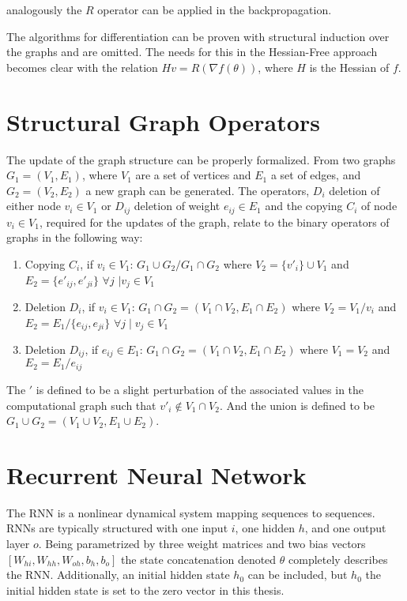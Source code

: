 \noindent
analogously the $R$ operator can be applied in the backpropagation.

The algorithms for differentiation can be proven with structural induction over the graphs and are omitted. The needs for this in the Hessian-Free approach becomes clear with the relation $Hv = R(\nabla f(\theta))$, where $H$ is the Hessian of $f$. 

\section{Structural Graph Operators}

The update of the graph structure can be properly formalized. From two graphs $G_1 = (V_1,E_1)$, where $V_1$ are a set of vertices and $E_1$ a set of edges, and $G_2 = (V_2, E_2)$ a new graph can be generated. The operators, $D_i$ deletion of either node $v_i \in V_1$ or $D_{ij}$ deletion of weight $e_{ij} \in E_1$ and the copying $C_i$ of node $v_i \in V_1$, required for the updates of the graph, relate to the binary operators of graphs in the following way:

\begin{enumerate}
    \item Copying $C_i$, if $v_i \in V_1$: $G_1 \cup G_2 / G_1 \cap G_2$ where $V_2 = \{v'_i\} \cup V_1$ and $E_2 = \{e'_{ij}, e'_{ji}\}$ $\forall j$ $\mid v_j \in V_1$
    \item Deletion $D_i $, if $v_i \in V_1$: $G_1 \cap G_2 = (V_1 \cap V_2, E_1 \cap E_2)$ where $V_2 = V_1 / v_i$ and $E_2 = E_1 / \{e_{ij}, e_{ji}\} $ $ \forall j \mid v_j \in V_1 $
    \item Deletion $D_{ij}$, if $e_{ij} \in E_1$: $G_1 \cap G_2 = (V_1 \cap V_2, E_1 \cap E_2)$ where $V_1 = V_2$ and $E_2 = E_1 / e_{ij}$
\end{enumerate}

\noindent
The $'$ is defined to be a slight perturbation of the associated values in the computational graph such that $v'_i \notin V_1 \cap V_2$. And the union is defined to be $G_1 \cup G_2 = (V_1 \cup V_2, E_1 \cup E_2)$.

\section{Recurrent Neural Network}

The RNN is a nonlinear dynamical system mapping sequences to sequences. RNNs are typically structured with one input $i$, one hidden $h$, and one output layer $o$. Being parametrized by three weight matrices and two bias vectors \([W_{hi}, W_{hh}, W_{oh}, b_h, b_o]\) the state concatenation denoted \(\theta\) completely describes the RNN. Additionally, an initial hidden state $h_0$ can be included, but $h_0$ the initial hidden state is set to the zero vector in this thesis.

